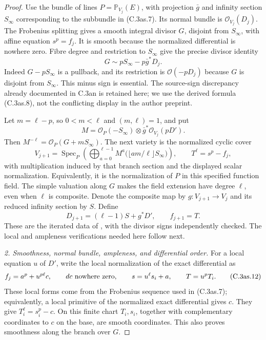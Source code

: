 \begin{proof}
Use the bundle of lines $P=\mathbb P_{V_j}(E)$, with projection
$\bar g$ and infinity section $S_\infty$ corresponding to the
subbundle in (C.3as.7). Its normal bundle is
$\mathcal O_{V_j}(D_j)$. The Frobenius splitting gives a smooth
integral divisor $G$, disjoint from $S_\infty$, with affine equation
$s^p=f_j$. It is smooth because the normalized differential is
nowhere zero. Fibre degree and restriction to $S_\infty$ give
the precise divisor identity
\[
                   G\sim pS_\infty-p\bar g^*D_j.
 \tag{C.3as.8}
\]
Indeed $G-pS_\infty$ is a pullback, and its restriction is
$\mathcal O(-pD_j)$ because $G$ is disjoint from $S_\infty$.
This minus sign is essential. The source-sign discrepancy already
documented in C.3an is retained here; we use the derived formula
(C.3as.8), not the conflicting display in the author preprint.

Let $m=\ell-p$, so $0<m<\ell$ and $(m,\ell)=1$, and put
\[
 M=\mathcal O_P(-S_\infty)\otimes
                       \bar g^*\mathcal O_{V_j}(pD').
 \tag{C.3as.9}
\]
Then $M^{-\ell}=\mathcal O_P(G+mS_\infty)$.
The next variety is the normalized cyclic cover
\[
 V_{j+1}=
 \operatorname{Spec}_P
 \left(\bigoplus_{a=0}^{\ell-1}
        M^a\bigl(\lfloor am/\ell\rfloor S_\infty\bigr)\right),
 \qquad T^\ell=s^p-f_j,
 \tag{C.3as.10}
\]
with multiplication induced by that branch section and the displayed
scalar normalization. Equivalently, it is the normalization of $P$
in this specified function field. The simple valuation along $G$
makes the field extension have degree $\ell$, even when $\ell$
is composite. Denote the composite map by $g:V_{j+1}\to V_j$
and its reduced infinity section by $S$. Define
\[
                    D_{j+1}=(\ell-1)S+g^*D',
                    \qquad f_{j+1}=T .
 \tag{C.3as.11}
\]
These are the iterated data of
\citet[Definition~2.1, Lemma~2.2, Proposition~2.3, and
Section~2.4, author pp.~7--8 and 11--12]{D_Mukai2011},
with the divisor signs independently checked. The local and
ampleness verifications needed here follow next.

\emph{2. Smoothness, normal bundle, ampleness, and differential order.}
For a local equation $u$ of $D'$, write the local normalization
of the exact differential as
\[
       f_j=a^p+u^{p\ell}c,\qquad dc\ \hbox{nowhere zero},
       \qquad s=u^\ell s_i+a,\qquad T=u^pT_i.
 \tag{C.3as.12}
\]
These local forms come from the Frobenius sequence used in
(C.3as.7); equivalently, a local primitive of the normalized exact
differential gives $c$. They give
$T_i^\ell=s_i^p-c$.
On this finite chart $T_i,s_i$, together with complementary
coordinates to $c$ on the base, are smooth coordinates. This
also proves smoothness along the branch over $G$.


\end{proof}
